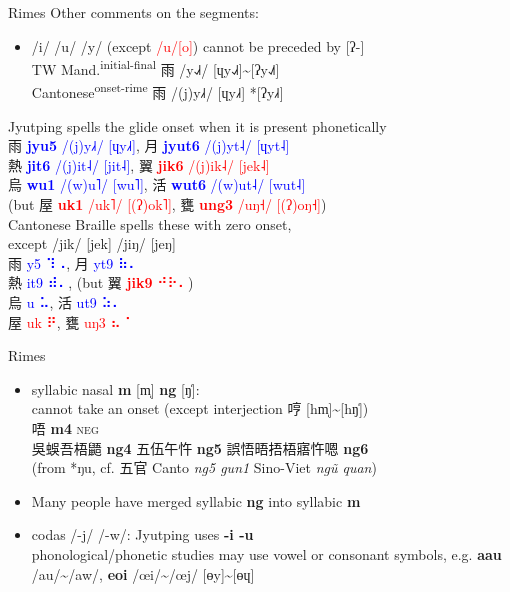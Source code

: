 \documentclass{beamer}
\newcommand{\braille}[1]{{\braillefont #1}}
\begin{document}
\begin{frame}[fragile]{Rimes}
Other comments on the segments:
\begin{itemize}
    \item /i/ /u/ /y/ (except \textcolor{red}{/u/[o]}) cannot be preceded by [ʔ-]\\
    TW Mand.\textsuperscript{initial-final} 雨 /y˨˩˧/ [ɥy˨˩˧]\~{}[ʔy˨˩˦]\\
    Cantonese\textsuperscript{onset-rime} 雨 /(j)y˩˧/ [ɥy˩˧] *[ʔy˩˧]\\
\end{itemize}
\medskip
    Jyutping spells the glide onset when it is present phonetically\\
    雨 \textcolor{blue}{\textbf{jyu5} /(j)y˩˧/ [ɥy˩˧]}, 月 \textcolor{blue}{\textbf{jyut6} /(j)yt˨/ [ɥyt˨]}\\
    熱 \textcolor{blue}{\textbf{jit6} /(j)it˨/ [jit˨]}, 翼 \textcolor{red}{\textbf{jik6} /(j)ik˨/ [jek˨]}\\ 
    烏 \textcolor{blue}{\textbf{wu1} /(w)u˥/ [wu˥]}, 活 \textcolor{blue}{\textbf{wut6} /(w)ut˨/ [wut˨]}\\ (but 屋 \textcolor{red}{\textbf{uk1} /uk˥/ [(ʔ)ok˥]}, 甕 \textcolor{red}{\textbf{ung3} /uŋ˧/ [(ʔ)oŋ˧]})\\
\smallskip
Cantonese Braille spells these with zero onset,\\ \quad except /jik/ [jek] /jiŋ/ [jeŋ]\\
雨 \textcolor{blue}{y5 \braille{⠹⠠}}, 月 \textcolor{blue}{yt9 \braille{⠷⠄}}\\
熱 \textcolor{blue}{it9 \braille{⠾⠄}}, (but 翼 \textcolor{red}{\textbf{jik9} \braille{⠚⠗⠄}})\\ 
烏 \textcolor{blue}{u \braille{⠥}}, 活 \textcolor{blue}{ut9 \braille{⠵⠄}}\\ 屋 \textcolor{red}{uk \braille{⠟}}, 甕 \textcolor{red}{uŋ3 \braille{⠦⠈}}\\
\end{frame}

\begin{frame}[fragile]{Rimes}
\begin{itemize}
     \item syllabic nasal \textbf{m} [m̩] \textbf{ng} [ŋ̍]:\\
    cannot take an onset (except interjection 哼 [hm̩]\~{}[hŋ̍])\\
    \smallskip
    唔 \textbf{m4} \textsc{neg}\\
    吳蜈吾梧鼯 \textbf{ng4} 五伍午忤 \textbf{ng5} 誤悟晤捂梧寤忤嗯 \textbf{ng6}\\
    (from *ŋu, cf. 五官 Canto \emph{ng5 gun1} Sino-Viet \emph{ngũ quan})
    \item Many people have merged syllabic \textbf{ng} into syllabic \textbf{m}
    \item codas /-j/ /-w/: Jyutping uses \textbf{-i -u}\\
    phonological/phonetic studies may use vowel or consonant symbols, e.g. \textbf{aau} /au/\~{}/aw/, \textbf{eoi} /œi/\~{}/œj/ [ɵy]\~{}[ɵɥ]
\end{itemize}

\end{frame}
\end{document}
